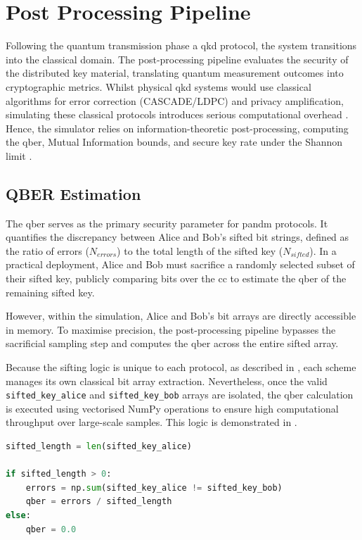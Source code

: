 \newpage
\section{Post Processing Pipeline}
\label{sec:postprocessing}

Following the quantum transmission phase a \gls{qkd} protocol, the system transitions into the classical domain. The post-processing pipeline evaluates the security of the distributed key material, translating quantum measurement outcomes into cryptographic metrics. Whilst physical \gls{qkd} systems would use classical algorithms for error correction (CASCADE/LDPC) and privacy amplification, simulating these classical protocols introduces serious computational overhead \cite{Cascade1994}. Hence, the simulator relies on information-theoretic post-processing, computing the \gls{qber}, Mutual Information bounds, and secure key rate under the Shannon limit \cite{Shannon1948}.

\subsection{QBER Estimation}
\label{subsec:QBER}

The \gls{qber} serves as the primary security parameter for \gls{pandm} protocols. It quantifies the discrepancy between Alice and Bob's sifted bit strings, defined as the ratio of errors ($N_{errors}$) to the total length of the sifted key ($N_{sifted}$). In a practical deployment, Alice and Bob must sacrifice a randomly selected subset of their sifted key, publicly comparing bits over the \gls{cc} to estimate the \gls{qber} of the remaining sifted key.

However, within the simulation, Alice and Bob's bit arrays are directly accessible in memory. To maximise precision, the post-processing pipeline bypasses the sacrificial sampling step and computes the \gls{qber} across the entire sifted array.

Because the sifting logic is unique to each protocol, as described in , each scheme manages its own classical bit array extraction. Nevertheless, once the valid \texttt{sifted\_key\_alice} and \texttt{sifted\_key\_bob} arrays are isolated, the \gls{qber} calculation is executed using vectorised NumPy operations to ensure high computational throughput over large-scale samples. This logic is demonstrated in .

\begin{lstlisting}[language=Python, caption={Vectorised \gls{qber} Calculation Logic}, label={lst:qber_calc}]
sifted_length = len(sifted_key_alice)

if sifted_length > 0:
    errors = np.sum(sifted_key_alice != sifted_key_bob)
    qber = errors / sifted_length
else:
    qber = 0.0
\end{lstlisting}


